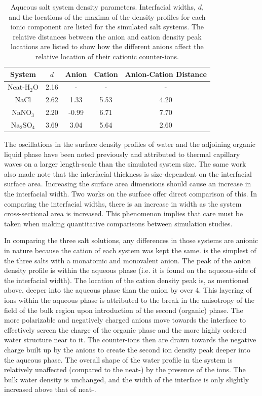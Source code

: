 \begin{table}[htdp]
	\begin{center}
	\begin{tabular}{|c||c|c|c|c|}
		\hline
		System & $d$ & Anion & Cation & Anion-Cation Distance \\ \hline
		Neat-H$_2$O & 2.16 & - & - & - \\ 
		NaCl & 2.62 & 1.33 & 5.53 & 4.20 \\
		NaNO$_3$ & 2.20 & -0.99 & 6.71 & 7.70 \\
		Na$_2$SO$_4$ & 3.69 & 3.04 & 5.64 & 2.60 \\
		\hline
	\end{tabular}
	\end{center}
	\caption{Aqueous salt system density parameters. Interfacial widths, $d$, and the locations of the maxima of the density profiles for each ionic component are listed for the simulated salt systems. The relative distances between the anion and cation density peak locations are listed to show how the different anions affect the relative location of their cationic counter-ions.}
	\label{system-params}
\end{table}

The oscillations in the surface density profiles of water and the adjoining organic \ctc liquid phase have been noted previously and attributed to thermal capillary waves on a larger length-scale than the simulated system size.\cite{Chang1996} The same work also made note that the interfacial thickness is size-dependent on the interfacial surface area. Increasing the surface area dimensions should cause an increase in the interfacial width. Two works on the \ctcwat surface offer direct comparison of this.\cite{Chang1996,Hore2008} In comparing the interfacial widths, there is an increase in width as the system cross-sectional area is increased. This phenomenon implies that care must be taken when making quantitative comparisons between simulation studies.

In comparing the three salt solutions, any differences in those systems are anionic in nature because the cation of each system was kept the same. \nacl is the simplest of the three salts with a monatomic and monovalent anion. The peak of the anion density profile is within the aqueous phase (i.e. it is found on the aqueous-side of the interfacial width). The location of the cation density peak is, as mentioned above, deeper into the aqueous phase than the anion by over 4\angs. This layering of ions within the aqueous phase is attributed to the break in the anisotropy of the field of the bulk region upon introduction of the second (organic) phase. The more polarizable and negatively charged anions move towards the interface to effectively screen the charge of the organic phase and the more highly ordered water structure near to it. The counter-ions then are drawn towards the negative charge built up by the anions to create the second ion density peak deeper into the aqueous phase. The overall shape of the water profile in the \nacl system is relatively unaffected (compared to the neat-\wat) by the presence of the ions. The bulk water density is unchanged, and the width of the interface is only slightly increased above that of neat-\wat.

